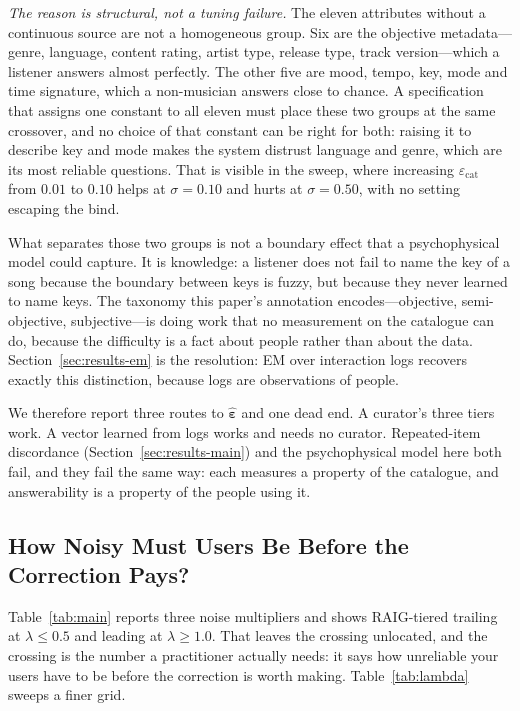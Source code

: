 \emph{The reason is structural, not a tuning failure.} The eleven attributes
without a continuous source are not a homogeneous group. Six are the objective
metadata---genre, language, content rating, artist type, release type, track
version---which a listener answers almost perfectly. The other five are mood,
tempo, key, mode and time signature, which a non-musician answers close to
chance. A specification that assigns one constant to all eleven must place
these two groups at the same crossover, and no choice of that constant can be
right for both: raising it to describe key and mode makes the system distrust
language and genre, which are its most reliable questions. That is visible in
the sweep, where increasing $\varepsilon_{\text{cat}}$ from $0.01$ to $0.10$
helps at $\sigma = 0.10$ and hurts at $\sigma = 0.50$, with no setting escaping
the bind.

What separates those two groups is not a boundary effect that a psychophysical
model could capture. It is knowledge: a listener does not fail to name the key
of a song because the boundary between keys is fuzzy, but because they never
learned to name keys. The taxonomy this paper's annotation encodes---objective,
semi-objective, subjective---is doing work that no measurement on the catalogue
can do, because the difficulty is a fact about people rather than about the
data. Section~\ref{sec:results-em} is the resolution: EM over interaction logs
recovers exactly this distinction, because logs are observations of people.

We therefore report three routes to $\hat{\boldsymbol\varepsilon}$ and one
dead end. A curator's three tiers work. A vector learned from logs works and
needs no curator. Repeated-item discordance (Section~\ref{sec:results-main})
and the psychophysical model here both fail, and they fail the same way: each
measures a property of the catalogue, and answerability is a property of the
people using it.

\subsection{How Noisy Must Users Be Before the Correction Pays?}
\label{sec:results-lambda}

Table~\ref{tab:main} reports three noise multipliers and shows RAIG-tiered
trailing at $\lambda \le 0.5$ and leading at $\lambda \ge 1.0$. That leaves the
crossing unlocated, and the crossing is the number a practitioner actually
needs: it says how unreliable your users have to be before the correction is
worth making. Table~\ref{tab:lambda} sweeps a finer grid.

